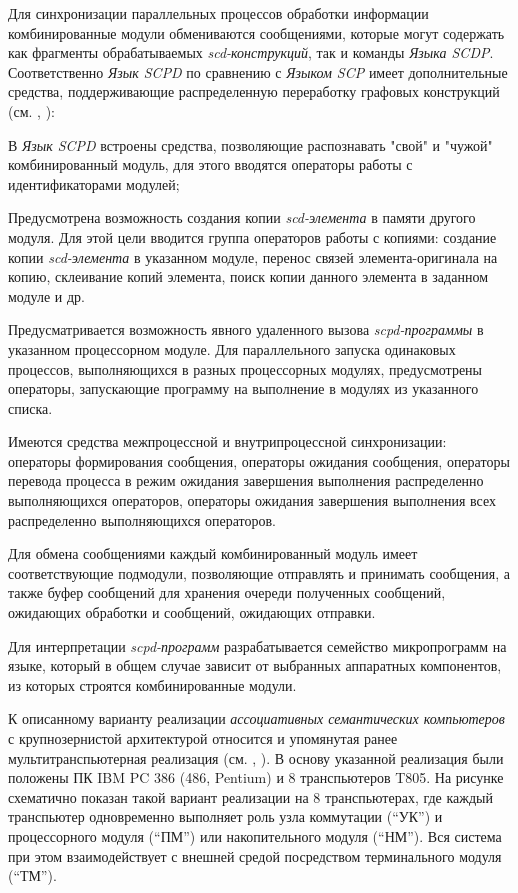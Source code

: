 \begin{textitemize}
	\item Для синхронизации параллельных процессов обработки информации комбинированные модули обмениваются сообщениями, которые могут содержать как фрагменты обрабатываемых \textit{scd-конструкций}, так и команды \textit{Языка SCDP}. Соответственно \textit{Язык SCPD} по сравнению с \textit{Языком SCP} имеет дополнительные средства, поддерживающие распределенную переработку графовых конструкций (см. , ):
	\begin{textitemize}
		\item В \textit{Язык SCPD} встроены средства, позволяющие распознавать "свой"{} и "чужой"{} комбинированный модуль, для этого вводятся операторы работы с идентификаторами модулей;
		\item Предусмотрена возможность создания копии \textit{scd-элемента} в памяти другого модуля. Для этой цели вводится группа операторов работы с копиями: создание копии \textit{scd-элемента} в указанном модуле, перенос связей элемента-оригинала на копию, склеивание копий элемента, поиск копии данного элемента в заданном модуле и др.
		\item Предусматривается возможность явного удаленного вызова \textit{scpd-программы} в указанном процессорном модуле. Для параллельного запуска одинаковых процессов, выполняющихся в разных процессорных модулях, предусмотрены операторы, запускающие программу на выполнение в модулях из указанного списка.
		\item Имеются средства межпроцессной и внутрипроцессной синхронизации: операторы формирования сообщения, операторы ожидания сообщения, операторы перевода процесса в режим ожидания завершения выполнения распределенно выполняющихся операторов, операторы ожидания завершения выполнения всех распределенно выполняющихся операторов.
	\end{textitemize}
	\item Для обмена сообщениями каждый комбинированный модуль имеет соответствующие подмодули, позволяющие отправлять и принимать сообщения, а также буфер сообщений для хранения очереди полученных сообщений, ожидающих обработки и сообщений, ожидающих отправки.
	\item Для интерпретации \textit{scpd-программ} разрабатывается семейство микропрограмм на языке, который в общем случае зависит от выбранных аппаратных компонентов, из которых строятся комбинированные модули.
\end{textitemize}

К описанному варианту реализации \textit{ассоциативных семантических компьютеров} с крупнозернистой архитектурой относится и упомянутая ранее мультитранспьютерная реализация  (см. , ). В основу указанной реализация были положены ПК IBM PC 386 (486, Pentium) и 8 транспьютеров T805. На рисунке \textit{} схематично показан такой вариант реализации на 8 транспьютерах, где каждый транспьютер одновременно выполняет роль узла коммутации (``УК'') и процессорного модуля (``ПМ'') или накопительного модуля (``НМ''). Вся система при этом взаимодействует с внешней средой посредством терминального модуля (``ТМ'').

